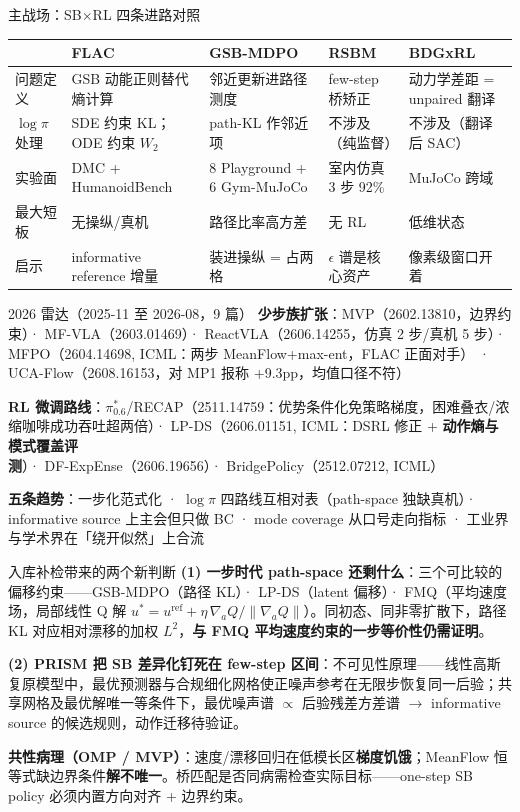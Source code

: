 \documentclass[10pt,aspectratio=169,fontset=none]{ctexbeamer}
\begin{document}
\begin{frame}{主战场：SB$\times$RL 四条进路对照}
\footnotesize
\begin{tabular}{@{}p{}p{}p{}p{}p{}@{}}
\toprule
 & \textbf{FLAC} & \textbf{GSB-MDPO} & \textbf{RSBM} & \textbf{BDGxRL} \\
\midrule
问题定义 & GSB 动能正则替代熵计算 & 邻近更新进路径测度 & few-step 桥矫正 & 动力学差距 = unpaired 翻译 \\
$\log\pi$ 处理 & SDE 约束 KL；ODE 约束 $W_2$ & path-KL 作邻近项 & 不涉及（纯监督） & 不涉及（翻译后 SAC） \\
实验面 & DMC + HumanoidBench & 8 Playground + 6 Gym-MuJoCo & 室内仿真 3 步 92\% & MuJoCo 跨域 \\
最大短板 & 无操纵/真机 & 路径比率高方差 & 无 RL & 低维状态 \\
启示 & informative reference 增量 & 装进操纵 = 占两格 & $\epsilon$ 谱是核心资产 & 像素级窗口开着 \\
\bottomrule
\end{tabular}
\end{frame}

\begin{frame}{2026 雷达（2025-11 至 2026-08，9 篇）}
\textbf{少步族扩张}：MVP（2602.13810，边界约束）· MF-VLA（2603.01469）· ReactVLA（2606.14255，仿真 2 步/真机 5 步）· \alert{MFPO（2604.14698, ICML：两步 MeanFlow+max-ent，FLAC 正面对手）} · UCA-Flow（2608.16153，对 MP1 报称 +9.3pp，均值口径不符）
\vspace{6pt}

\textbf{RL 微调路线}：$\pi^*_{0.6}$/RECAP（2511.14759：优势条件化免策略梯度，困难叠衣/浓缩咖啡成功吞吐超两倍）· LP-DS（2606.01151, ICML：DSRL 修正 + \textbf{动作熵与模式覆盖评测}）· DF-ExpEnse（2606.19656）· BridgePolicy（2512.07212, ICML）
\vspace{6pt}

\textbf{五条趋势}：一步化范式化 · $\log\pi$ 四路线互相对表（path-space 独缺真机）· informative source 上主会但只做 BC · mode coverage 从口号走向指标 · 工业界与学术界在「绕开似然」上合流
\end{frame}

\begin{frame}{入库补检带来的两个新判断}
\textbf{(1) 一步时代 path-space 还剩什么}：三个可比较的偏移约束——GSB-MDPO（路径 KL）· LP-DS（latent 偏移）· FMQ（平均速度场，局部线性 Q 解 $u^*=u^{\mathrm{ref}}+\eta\,\nabla_aQ/\|\nabla_aQ\|$）。同初态、同非零扩散下，路径 KL 对应相对漂移的加权 $L^2$，\textbf{与 FMQ 平均速度约束的一步等价性仍需证明}。
\vspace{6pt}

\textbf{(2) PRISM 把 SB 差异化钉死在 few-step 区间}：不可见性原理——线性高斯复原模型中，最优预测器与合规细化网格使正噪声参考在无限步恢复同一后验；共享网格及最优解唯一等条件下，最优噪声谱 $\propto$ 后验残差方差谱 $\to$ informative source 的候选规则，动作迁移待验证。
\vspace{6pt}

\textbf{共性病理（OMP / MVP）}：速度/漂移回归在低模长区\textbf{梯度饥饿}；MeanFlow 恒等式缺边界条件\textbf{解不唯一}。桥匹配是否同病需检查实际目标——one-step SB policy 必须内置方向对齐 + 边界约束。
\end{frame}
\end{document}
